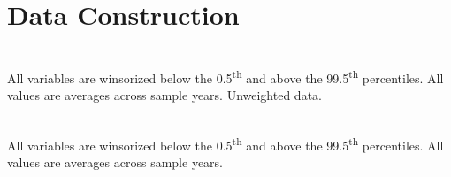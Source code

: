 \documentclass[12pt,notitlepage]{article}
\begin{document}



\FloatBarrier
\section{Data Construction} %
\label{sec:Data_Construction_appendix}
\FloatBarrier


\begin{table}[!htpb]
\caption{Unweighted French Summary Statistics}
\tabularnewline \\
All variables are winsorized below the 0.5\textsuperscript{th} and above the 99.5\textsuperscript{th} percentiles. All values are averages across sample years. Unweighted data. 
\end{table}

\begin{table}[!htpb]
\caption{Unweighted French Summary Statistics}
 \\
All variables are winsorized below the 0.5\textsuperscript{th} and above the 99.5\textsuperscript{th} percentiles. All values are averages across sample years.
\end{table}





\end{document}
